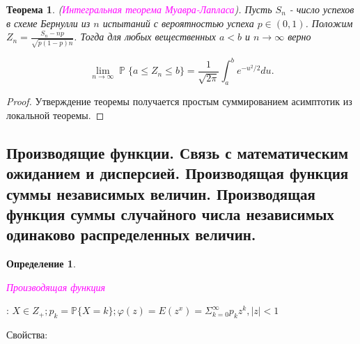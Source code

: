 \documentclass[a4paper,100pt]{article}
\theoremstyle{indented}
\newtheorem{theorem}{Теорема}
\theoremstyle{definition}
\newtheorem{defn}{Определение}
\theoremstyle{remark}
\DeclareMathOperator{\ra}{\rightarrow}
\DeclareMathOperator{\PP}{\mathbb{P}}
\begin{document}
\begin{theorem}
  (\hypertarget{n25}{\textcolor{magenta}{\textit{Интегральная теорема Муавра-Лапласа}}}). Пусть $S_n$ - число успехов в схеме Бернулли из $n$ испытаний с вероятностью успеха $p\in (0, 1)$. Положим $Z_n = \frac{S_n - np}{\sqrt{p(1-p)n}}$. Тогда для любых вещественных $a<b$ и $n \ra \infty$ верно

  \[
    \lim_{n \ra \infty} \PP \{a \leq Z_n \leq b\} = \frac{1}{\sqrt{2\pi }} \int_a^b e^{-u^2/2}du. 
  \]
\end{theorem}

\begin{proof}
  Утверждение теоремы получается простым суммированием асимптотик из локальной теоремы.
\end{proof}

\subsection{Производящие функции. Связь с математическим ожиданием и дисперсией. Производящая функция суммы независимых величин. Производящая функция суммы случайного числа независимых одинаково распределенных величин.} 

\begin{defn}
  \hypertarget{n26}{\textcolor{magenta}{\textit{Производящая функция}}}: 
   $X \in Z_{+}; p_k = \mathbb{P}\{X = k\}; \varphi(z) = E(z^x) = \Sigma_{k=0}^{\infty}{p_k z^k}, |z| < 1$
\end{defn}   
   
Свойства:
\end{document}
